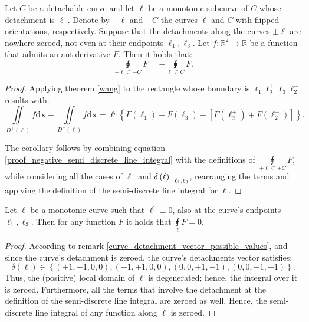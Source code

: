 \documentclass[11pt]{book}
\begin{document}
\begin{corollary}Let $C$ be a detachable curve and let $\ell$ be a monotonic subcurve of $C$ whose detachment is $\ell^;$. Denote by $-\ell$ and $-C$ the curves $\ell$ and $C$ with flipped orientations, respectively.
Suppose that the detachments along the curves $\pm\ell$ are nowhere zeroed, not even at their endpoints $\ell_1,\ell_3$. Let $f:\mathbb{R}^2\rightarrow\mathbb{R}$ be a function that admits an antiderivative $F$. Then it holds that:
$$\underset{-\ell\subset-C}{\sqint}F=-\underset{\ell\subset C}{\sqint}F.$$
\end{corollary}
\begin{proof}Applying theorem \ref{wang} to the rectangle whose boundary is $\ell_1\ell_2^+\ell_3\ell_2^-$ results with:
$$\label{proof_negative_semi_discrete_line_integral}\underset{D^{+}\left(\ell\right)}{\iint}f\boldsymbol{dx}+\underset{D^{-}\left(\ell\right)}{\iint}f\boldsymbol{dx}=\ell^{;}\left\{ F\left(\ell_{1}\right)+F\left(\ell_{3}\right)-\left[F\left(\ell_{2}^{+}\right)+F\left(\ell_{2}^{-}\right)\right]\right\}.$$

The corollary follows by combining equation \ref{proof_negative_semi_discrete_line_integral} with the definitions of $\underset{\pm\ell\subset \pm C}{\sqint}F,$ while considering all the cases of $\ell^;$ and $\delta\left(\ell\right)\bigm\lvert_{\ell_1,\ell_3}$, rearranging the terms and applying the definition of the semi-discrete line integral for $\ell$.
\end{proof}

\begin{corollary}Let $\ell$ be a monotonic curve such that $\ell^;\equiv0$, also at the curve’s endpoints $\ell_1,\ell_3$. Then for any function $F$ it holds that $\underset{\ell}{\sqint}F=0.$
\end{corollary}
\begin{proof}According to remark \ref{curve_detachment_vector_possible_values}, and since the curve’s detachment is zeroed, the curve’s detachments vector satisfies:
$$\delta\left(\ell\right)\in\left\{\left(+1,-1,0,0\right),\left(-1,+1,0,0\right),\left(0,0,+1,-1\right),\left(0,0,-1,+1\right)\right\}.$$
Thus, the (positive) local domain of $\ell$ is degenerated; hence, the integral over it is zeroed. Furthermore, all the terms that involve the detachment at the definition of the semi-discrete line integral are zeroed as well. Hence, the semi-discrete line integral of any function along $\ell$ is zeroed.
\end{proof}
\end{document}

